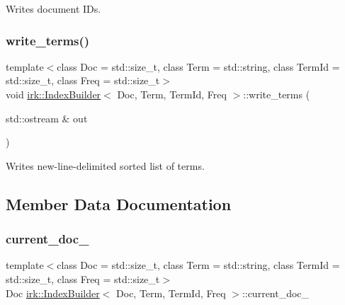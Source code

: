 Writes document I\+Ds. 

\mbox{\label{classirk_1_1IndexBuilder_a2d09111c86b6af9f254b6f6fed711ba2}} 
\subsubsection{\texorpdfstring{write\+\_\+terms()}{write\_terms()}}
{\footnotesize\ttfamily template$<$class Doc  = std\+::size\+\_\+t, class Term  = std\+::string, class Term\+Id  = std\+::size\+\_\+t, class Freq  = std\+::size\+\_\+t$>$ \\
void \mbox{\hyperlink{classirk_1_1IndexBuilder}{irk\+::\+Index\+Builder}}$<$ Doc, Term, Term\+Id, Freq $>$\+::write\+\_\+terms (\begin{DoxyParamCaption}\item[{std\+::ostream \&}]{out }\end{DoxyParamCaption})\hspace{0.3cm}{\ttfamily [inline]}}



Writes new-\/line-\/delimited sorted list of terms. 



\subsection{Member Data Documentation}
\mbox{\label{classirk_1_1IndexBuilder_a686ec90f6312863985cd1c5ece74834f}} 
\subsubsection{\texorpdfstring{current\+\_\+doc\+\_\+}{current\_doc\_}}
{\footnotesize\ttfamily template$<$class Doc  = std\+::size\+\_\+t, class Term  = std\+::string, class Term\+Id  = std\+::size\+\_\+t, class Freq  = std\+::size\+\_\+t$>$ \\
Doc \mbox{\hyperlink{classirk_1_1IndexBuilder}{irk\+::\+Index\+Builder}}$<$ Doc, Term, Term\+Id, Freq $>$\+::current\+\_\+doc\+\_\+\hspace{0.3cm}{\ttfamily [protected]}}

